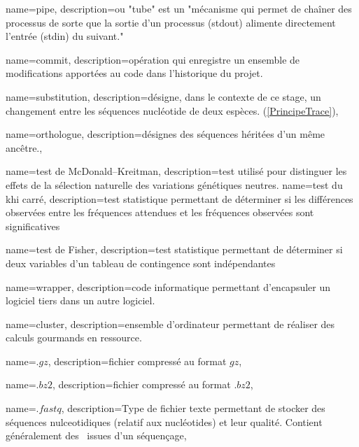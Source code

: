  {
    name=pipe,
    description={ou "tube" est un "mécanisme qui permet de chaîner des processus de sorte que la sortie d'un processus (stdout) alimente directement l'entrée (stdin) du suivant." \cite{LeDico}}
}
\newcommand{\pipe}{\gls{pipe}}

 {
    name=commit,
    description={opération qui enregistre un ensemble de modifications apportées au code dans l'historique du projet.}
}


 {
    name=substitution,
    description={désigne, dans le contexte de ce stage, un changement entre les séquences nucléotide de deux espèces. (\cref{PrincipeTrace})},
}

 {
    name=orthologue,
    description={désignes des séquences héritées d'un même ancêtre.},
}

 {
    name=test de McDonald–Kreitman,
    description={test utilisé pour distinguer les effets de la sélection naturelle des variations génétiques neutres.}
}
 {
    name=test du khi carré,
    description={test statistique permettant de déterminer si les différences observées entre les fréquences attendues et les fréquences observées sont significatives}
}

 {
    name=test de Fisher,
    description={test statistique permettant de déterminer si deux variables d'un tableau de contingence sont indépendantes}
}

 {
    name=wrapper,
    description={code informatique permettant d'encapsuler un logiciel tiers dans un autre logiciel.}
}

 {
    name=cluster,
    description={ensemble d'ordinateur permettant de réaliser des calculs gourmands en ressource.}
}

 {
    name=$.gz$,
    description={fichier compressé au format $gz$},
}
\newcommand{\gz}{"\gls{gz}"}

 {
    name=$.bz2$,
    description={fichier compressé au format $.bz2$},
}
\newcommand{\bz}{"\gls{bz}"}


 {
    name=$.fastq$,
    description={Type de fichier texte permettant de stocker des séquences nulceotidiques (relatif aux \glspl{nucléotide}) et leur qualité. Contient généralement des \reads issues d'un \gls{séquençage}},
}
\newcommand{\fastq}{"\gls{fastq}"}


